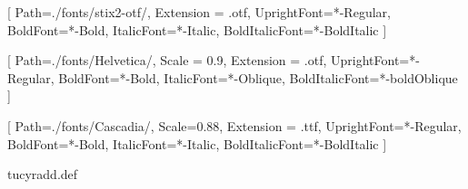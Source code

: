 \usepackage{ifxetex}
\ifxetex
    \usepackage{xltxtra}

    \setmainfont{STIXTwoText}[
        Path=./fonts/stix2-otf/,
        Extension = .otf,
        UprightFont=*-Regular,
        BoldFont=*-Bold,
        ItalicFont=*-Italic,
        BoldItalicFont=*-BoldItalic
    ]


    
    

    \setsansfont{Helvetica}[
        Path=./fonts/Helvetica/,
        Scale = 0.9,
        Extension = .otf,
        UprightFont=*-Regular,
        BoldFont=*-Bold,
        ItalicFont=*-Oblique,
        BoldItalicFont=*-boldOblique
    ]
    
    \setmonofont{CascadiaCode}[
        Path=./fonts/Cascadia/,
        Scale=0.88,
        Extension = .ttf,
        UprightFont=*-Regular,
        BoldFont=*-Bold,
        ItalicFont=*-Italic,
        BoldItalicFont=*-BoldItalic
    ]

    
    {tucyradd.def}
\else
    \usepackage[utf8]{inputenc}
    \usepackage[T2A]{fontenc}
\fi

